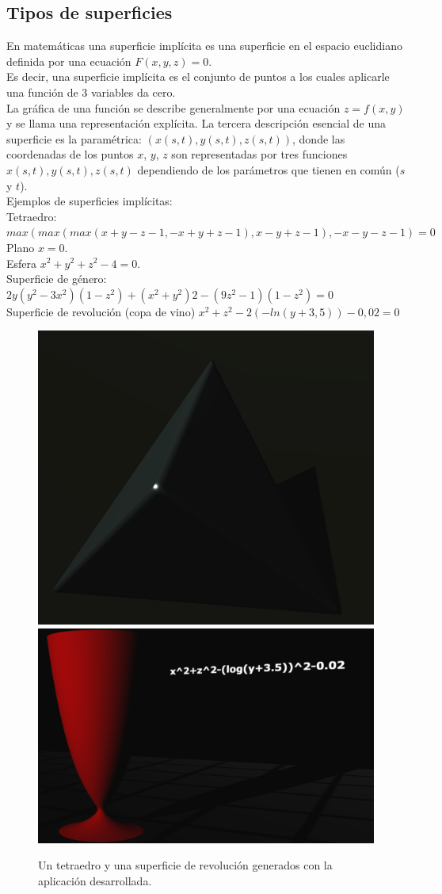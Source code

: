 \documentclass[12pt]{article}
\begin{document}
\subsection{Tipos de superficies}
En matemáticas una superficie implícita es una superficie en el espacio euclidiano definida por una ecuación $F (x, y, z) = 0$.
\\Es decir, una superficie implícita es el conjunto de puntos a los cuales aplicarle una función de 3 variables da cero. 
\\La gráfica de una función se describe generalmente por una ecuación $z = f (x, y)$ y se llama una representación explícita\cite{implicitas}\cite{realtimerendering}. La tercera descripción esencial de una superficie es la paramétrica: $(x(s, t), y (s, t), z (s, t))$, donde las coordenadas de los puntos $x$, $y$, $z$ son representadas por tres funciones $x(s, t), y(s, t) , z(s, t)$ dependiendo de los parámetros que tienen en común ($s$ y $t$).
\\Ejemplos de superficies implícitas:
\\Tetraedro: $max(max(max(x + y - z - 1, -x + y + z - 1), x - y + z -1), -x - y - z - 1) = 0$
\\Plano $x = 0$.
\\Esfera  $x^2 +y^2 +z^2 - 4 = 0$.
\\Superficie de género:  $2y (y^2 -3x^2) (1-z^2) + (x^2 +y^2)2- (9z^2-1) (1-z^2) =0$ 
\\Superficie de revolución (copa de vino) $x^2 + z^2 - 2(- ln (y+ 3,5)) - 0,02 = 0$
\begin{figure}[ht]
\includegraphics[width =0.45\linewidth]{tetraedro.png}
\hfill
\includegraphics[width =0.45\linewidth]{copa.png}
\caption{ Un tetraedro y una superficie de revolución generados con la aplicación desarrollada.}
\label{ fig : surface }
\end{figure}
\end{document}
